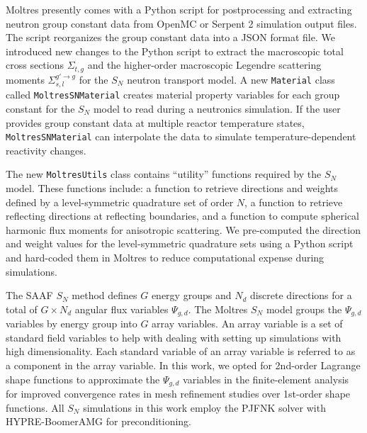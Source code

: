 Moltres presently comes with a Python script for postprocessing and extracting neutron group
constant data from OpenMC \cite{boyd_multigroup_2019} or Serpent 2 \cite{leppanen_serpent_2014}
simulation output files. The script reorganizes the group constant data into a
JSON format file. We introduced new changes to the Python script to extract
the macroscopic total cross sections $\Sigma_{t,g}$ and the higher-order macroscopic Legendre
scattering moments $\Sigma^{g'\rightarrow g}_{s,l}$ for the $S_N$ neutron transport model. A new
\texttt{Material} class called \texttt{MoltresSNMaterial} creates material
property variables for each group constant for the $S_N$ model to read during a neutronics
simulation. If the user provides group constant data at multiple reactor temperature states,
\texttt{MoltresSNMaterial} can interpolate the data to simulate temperature-dependent reactivity
changes.

The new \texttt{MoltresUtils} class contains ``utility'' functions required by the $S_N$ model.
These functions include: a function to retrieve directions and weights defined by a
level-symmetric quadrature set of order $N$, a function to retrieve reflecting directions at
reflecting boundaries, and a function to compute spherical harmonic flux moments for anisotropic
scattering. We pre-computed the direction and weight values for the level-symmetric quadrature sets
using a Python script and hard-coded them in Moltres to reduce computational expense during
simulations.

The \gls{SAAF} $S_N$ method defines $G$ energy groups and $N_d$ discrete directions for a total
of $G\times N_d$ angular flux variables $\Psi_{g,d}$. The Moltres $S_N$ model groups the
$\Psi_{g,d}$ variables by energy group into $G$ array variables. An array variable is a
set of standard field variables to help with dealing with setting up simulations with high
dimensionality. Each standard variable of an array variable is referred to as a component in the
array variable. In this work, we opted for
2nd-order Lagrange shape functions to approximate the $\Psi_{g,d}$ variables in the finite-element
analysis for improved convergence rates in mesh refinement studies over 1st-order shape functions.
All $S_N$ simulations in this work
employ the \gls{PJFNK} solver \cite{knoll_jacobian-free_2004} with HYPRE-BoomerAMG
\cite{hypre_hypre_2022} for preconditioning.

